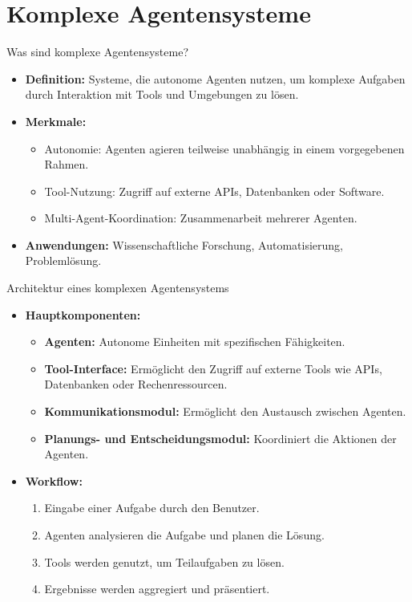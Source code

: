 \documentclass[aspectratio=1610, xcolor=dvipsnames, 9pt]{beamer}
\begin{document}
\section{Komplexe Agentensysteme}

\begin{frame}{Was sind komplexe Agentensysteme?}
  \begin{itemize}
    \item \textbf{Definition:} Systeme, die autonome Agenten nutzen, um komplexe Aufgaben durch Interaktion mit Tools und Umgebungen zu lösen.
    \item \textbf{Merkmale:}
      \begin{itemize}
        \item Autonomie: Agenten agieren teilweise unabhängig in einem vorgegebenen Rahmen.
        \item Tool-Nutzung: Zugriff auf externe APIs, Datenbanken oder Software.
        \item Multi-Agent-Koordination: Zusammenarbeit mehrerer Agenten.
      \end{itemize}
    \item \textbf{Anwendungen:} Wissenschaftliche Forschung, Automatisierung, Problemlösung.
  \end{itemize}
\end{frame}

\begin{frame}{Architektur eines komplexen Agentensystems}
  \begin{itemize}
    \item \textbf{Hauptkomponenten:}
      \begin{itemize}
        \item \textbf{Agenten:} Autonome Einheiten mit spezifischen Fähigkeiten.
        \item \textbf{Tool-Interface:} Ermöglicht den Zugriff auf externe Tools wie APIs, Datenbanken oder Rechenressourcen.
        \item \textbf{Kommunikationsmodul:} Ermöglicht den Austausch zwischen Agenten.
        \item \textbf{Planungs- und Entscheidungsmodul:} Koordiniert die Aktionen der Agenten.
      \end{itemize}
    \item \textbf{Workflow:}
      \begin{enumerate}
        \item Eingabe einer Aufgabe durch den Benutzer.
        \item Agenten analysieren die Aufgabe und planen die Lösung.
        \item Tools werden genutzt, um Teilaufgaben zu lösen.
        \item Ergebnisse werden aggregiert und präsentiert.
      \end{enumerate}
  \end{itemize}
\end{frame}
\end{document}
